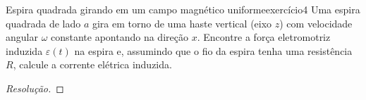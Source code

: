 \begin{exercício}{Espira quadrada girando em um campo magnético uniforme}{exercício4}
    Uma espira quadrada de lado \(a\) gira em torno de uma haste vertical (eixo \(z\)) com velocidade angular \(\omega\) constante apontando na direção \(x\). Encontre a força eletromotriz induzida \(\varepsilon(t)\) na espira e, assumindo que o fio da espira tenha uma resistência \(R\), calcule a corrente elétrica induzida.
\end{exercício}
\begin{proof}[Resolução]

\end{proof}
